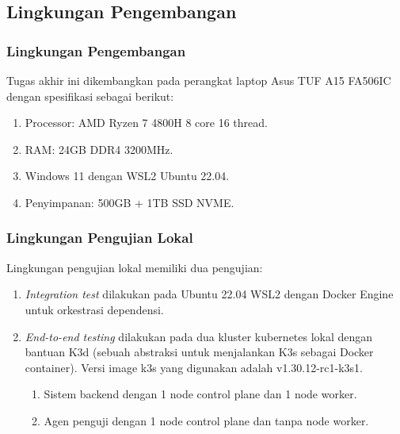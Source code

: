 \subsection{Lingkungan Pengembangan}

\subsubsection{Lingkungan Pengembangan}

Tugas akhir ini dikembangkan pada perangkat laptop Asus TUF A15 FA506IC dengan spesifikasi sebagai berikut:

\begin{enumerate}
    \item Processor: AMD Ryzen 7 4800H 8 core 16 thread.
    \item RAM: 24GB DDR4 3200MHz.
    \item Windows 11 dengan WSL2 Ubuntu 22.04.
    \item Penyimpanan: 500GB + 1TB SSD NVME.
\end{enumerate}

\subsubsection{Lingkungan Pengujian Lokal}

Lingkungan pengujian lokal memiliki dua pengujian:

\begin{enumerate}
    \item \textit{Integration test} dilakukan pada Ubuntu 22.04 WSL2 dengan Docker Engine untuk orkestrasi dependensi.
    \item \textit{End-to-end testing} dilakukan pada dua kluster kubernetes lokal dengan bantuan K3d (sebuah abstraksi untuk menjalankan K3s sebagai Docker container). Versi image k3s yang digunakan adalah v1.30.12-rc1-k3s1.
          \begin{enumerate}
              \item Sistem backend dengan 1 node control plane dan 1 node worker.
              \item Agen penguji dengan 1 node control plane dan tanpa node worker.
          \end{enumerate}
\end{enumerate}

